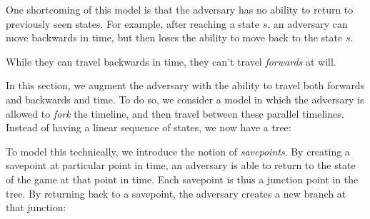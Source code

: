 One shortcoming of this model is that the adversary has no ability to
return to previously seen states.
For example, after reaching a state $s$, an adversary can move backwards
in time, but then loses the ability to move back to the state $s$.

While they can travel backwards in time, they can't travel \emph{forwards}
at will.

In this section, we augment the adversary with the ability to travel both
forwards and backwards and time.
To do so, we consider a model in which the adversary is allowed
to \emph{fork} the timeline, and then travel between these parallel timelines.
Instead of having a linear sequence of states, we now have a tree:

\begin{figure}[H]
\centering
{}
\end{figure}

To model this technically, we introduce the notion of \emph{savepoints}.
By creating a savepoint at particular point in time, an adversary is
able to return to the state of the game at that point in time.
Each savepoint is thus a junction point in the tree.
By returning back to a savepoint, the adversary creates a new branch
at that junction:

